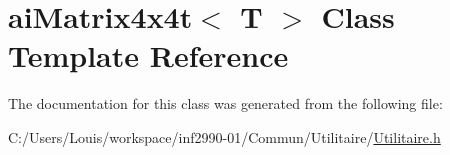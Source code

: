 \hypertarget{classai_matrix4x4t}{}\section{ai\+Matrix4x4t$<$ T $>$ Class Template Reference}
\label{classai_matrix4x4t}


The documentation for this class was generated from the following file\+:\begin{DoxyCompactItemize}
\item 
C\+:/\+Users/\+Louis/workspace/inf2990-\/01/\+Commun/\+Utilitaire/\hyperlink{_utilitaire_8h}{Utilitaire.\+h}\end{DoxyCompactItemize}

